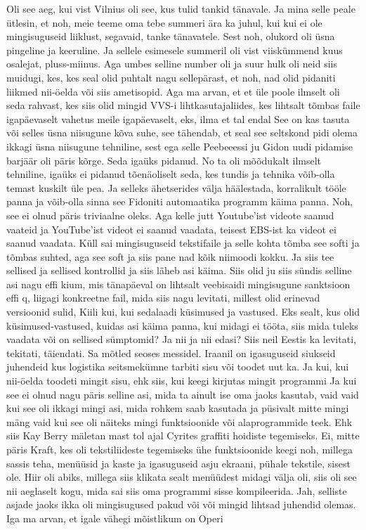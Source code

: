 Oli see aeg, kui vist Vilnius oli see, kus tulid tankid tänavale. Ja mina selle peale ütlesin, et noh, meie teeme oma tebe summeri ära ka juhul, kui kui ei ole mingisuguseid liiklust, segavaid, tanke tänavatele. Sest noh, olukord oli üsna pingeline ja keeruline. Ja sellele esimesele summeril oli vist viiskümmend kuus osalejat, pluss-miinus. Aga umbes selline number oli ja suur hulk oli neid siis muidugi, kes, kes seal olid puhtalt nagu sellepärast, et noh, nad olid pidaniti liikmed nii-öelda või siis ametisopid. Aga ma arvan, et et üle poole ilmselt oli seda rahvast, kes siis olid mingid VVS-i lihtkasutajaliides, kes lihtsalt tõmbas faile igapäevaselt vahetus meile igapäevaselt, eks, ilma et tal endal
See on kas tasuta või selles üsna niisugune kõva suhe, see tähendab, et seal see seltskond pidi olema ikkagi üsna niisugune tehniline, sest ega selle Peebeeessi ju Gidon uudi pidamise barjäär oli päris kõrge. Seda igaüks pidanud.
No ta oli mõõdukalt ilmselt tehniline, igaüks ei pidanud tõenäoliselt seda, kes tundis ja tehnika võib-olla temast kuskilt üle pea.
Ja selleks ähetserides välja häälestada, korralikult tööle panna ja võib-olla sinna see Fidoniti automaatika programm käima panna. Noh, see ei olnud päris triviaalne oleks. Aga kelle jutt Youtube'ist videote saanud vaateid ja YouTube'ist videot ei saanud vaadata, teisest EBS-ist ka videot ei saanud vaadata. Küll sai mingisuguseid tekstifaile ja selle kohta tõmba see softi ja tõmbas suhted, aga see soft ja siis pane nad kõik niimoodi kokku. Ja siis tee sellised ja sellised kontrollid ja siis läheb asi käima.
Siis olid ju siis sündis selline asi nagu effi kium, mis tänapäeval on lihtsalt veebisaidi mingisugune sanktsioon effi q, liigagi konkreetne fail, mida siis nagu levitati, millest olid erinevad versioonid sulid, Kiili kui, kui sedalaadi küsimused ja vastused.
Eks sealt, kus olid küsimused-vastused, kuidas asi käima panna, kui midagi ei tööta, siis mida tuleks vaadata või on sellised sümptomid? Ja nii ja nii edasi?
Siis neil Eestis ka levitati, tekitati, täiendati. Sa mõtled seoses messidel. Iraanil on igasuguseid siukseid juhendeid kus logistika seitsmekümne tarbiti sisu või toodet uut ka.
Ja kui, kui nii-öelda toodeti mingit sisu, ehk siis, kui keegi kirjutas mingit programmi
Ja kui see ei olnud nagu päris selline asi, mida ta ainult ise oma jaoks kasutab, vaid vaid kui see oli ikkagi mingi asi, mida rohkem saab kasutada ja püsivalt mitte mingi mäng vaid kui see oli näiteks mingi funktsioonide või alaprogrammide teek. Ehk siis Kay Berry mäletan mast tol ajal Cyrites graffiti hoidiste tegemiseks. Ei, mitte päris Kraft, kes oli tekstiliideste tegemiseks ühe funktsioonide keegi noh, millega sassis teha, menüüsid ja kaste ja igasuguseid asju ekraani, pühale tekstile, sisest ole. Hiir oli abiks, millega siis klikata sealt menüüdest midagi välja oli, siis oli see nii aeglaselt kogu, mida sai siis oma programmi sisse kompileerida. Jah, selliste asjade jaoks ikka oli mingisugused pakud või või mingid lihtsad juhendid olemas. Iga ma arvan, et igale vähegi mõistlikum on Operi
